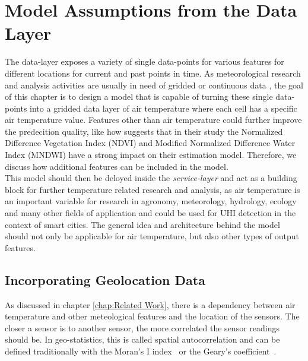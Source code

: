
\section{Model Assumptions from the Data Layer}

The data-layer exposes a variety of single data-points for various features for different locations for current and past points in time. As meteorological research and analysis activities are usually in need of gridded or continuous data \cite{sekulic2020spatio}, the goal of this chapter is to design a model that is capable of turning these single data-points into a gridded data layer of air temperature where each cell has a specific air temperature value. Features other than air temperature could further improve the predecition quality, like how \cite{alonso2020new} suggests that in their study the Normalized Difference Vegetation Index (NDVI) and Modified Normalized Difference Water Index (MNDWI) have a strong impact on their estimation model. Therefore, we discuss how additional features can be included in the model.\\
This model should then be deloyed inside the \textit{service-layer} and act as a building block for further temperature related research and analysis, as air temperature is an important variable for research in agronomy, meteorology, hydrology, ecology and many other fields of application and could be used for UHI detection in the context of smart cities. The general idea and architecture behind the model should not only be applicable for air temperature, but also other types of output features.


\subsection{Incorporating Geolocation Data}

As discussed in chapter \ref{chap:Related Work}, there is a dependency between air temperature and other meteological features and the location of the sensors. The closer a sensor is to another sensor, the more correlated the sensor readings should be.
In geo-statistics, this is called spatial autocorrelation and can be defined traditionally with the Moran's I index~\cite{moran1948interpretation} or the Geary's coefficient~\cite{geary1954contiguity}.

